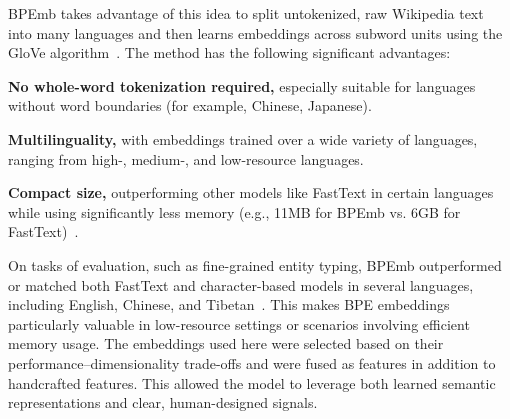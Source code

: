 BPEmb takes advantage of this idea to split untokenized, raw Wikipedia text into many languages and then learns embeddings across subword units using the GloVe algorithm~\cite{bpemb,glove}. The method has the following significant advantages:
\begin{compactitem}
\item \textbf{No whole-word tokenization required,} especially suitable for languages without word boundaries (for example, Chinese, Japanese).
\item \textbf{Multilinguality,} with embeddings trained over a wide variety of languages, ranging from high-, medium-, and low-resource languages.
\item \textbf{Compact size,} outperforming other models like FastText in certain languages while using significantly less memory (e.g., 11MB for BPEmb vs. 6GB for FastText)~\cite{bpemb,bojanowski-enriching}.
\end{compactitem}
On tasks of evaluation, such as fine-grained entity typing, BPEmb outperformed or matched both FastText and character-based models in several languages, including English, Chinese, and Tibetan~\cite{bpemb}. This makes BPE embeddings particularly valuable in low-resource settings or scenarios involving efficient memory usage.
The embeddings used here were selected based on their performance–dimensionality trade-offs and were fused as features in addition to handcrafted features. This allowed the model to leverage both learned semantic representations and clear, human-designed signals.


